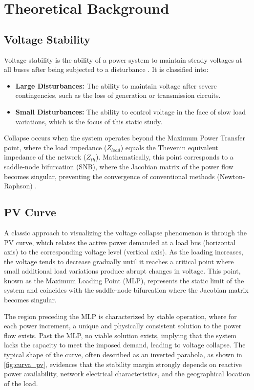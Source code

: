 \documentclass{ieeeaccess}
\begin{document}
\section{Theoretical Background}
\label{sec:background}

\subsection{Voltage Stability}
Voltage stability is the ability of a power system to maintain steady voltages at all buses after being subjected to a disturbance \cite{kundur1994power}. It is classified into:
\begin{itemize}
    \item \textbf{Large Disturbances:} The ability to maintain voltage after severe contingencies, such as the loss of generation or transmission circuits.
    \item \textbf{Small Disturbances:} The ability to control voltage in the face of slow load variations, which is the focus of this static study.
\end{itemize}

Collapse occurs when the system operates beyond the Maximum Power Transfer point, where the load impedance ($Z_{load}$) equals the Thevenin equivalent impedance of the network ($Z_{th}$). Mathematically, this point corresponds to a saddle-node bifurcation (SNB), where the Jacobian matrix of the power flow becomes singular, preventing the convergence of conventional methods (Newton-Raphson) \cite{cutsem2007voltage}.

\subsection{PV Curve}
A classic approach to visualizing the voltage collapse phenomenon is through the PV curve, which relates the active power demanded at a load bus (horizontal axis) to the corresponding voltage level (vertical axis). As the loading increases, the voltage tends to decrease gradually until it reaches a critical point where small additional load variations produce abrupt changes in voltage. This point, known as the Maximum Loading Point (MLP), represents the static limit of the system and coincides with the saddle-node bifurcation where the Jacobian matrix becomes singular.

The region preceding the MLP is characterized by stable operation, where for each power increment, a unique and physically consistent solution to the power flow exists. Past the MLP, no viable solution exists, implying that the system lacks the capacity to meet the imposed demand, leading to voltage collapse. The typical shape of the curve, often described as an inverted parabola, as shown in \autoref{fig:curva_pv}, evidences that the stability margin strongly depends on reactive power availability, network electrical characteristics, and the geographical location of the load.
\end{document}

